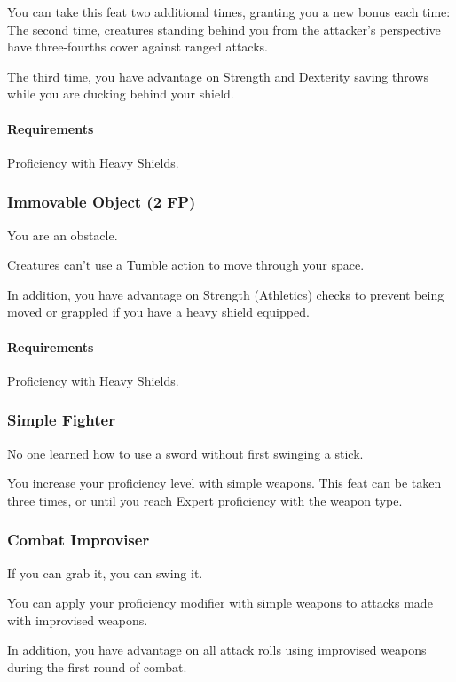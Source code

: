     You can take this feat two additional times, granting you a new bonus each time:
    The second time, creatures standing behind you from the attacker's perspective have three-fourths cover against ranged attacks.

    The third time, you have advantage on Strength and Dexterity saving throws while you are ducking behind your shield.
    \paragraph{Requirements} Proficiency with Heavy Shields.
\subsubsection{Immovable Object (2 FP)} \label{feat::immovableobject}
    You are an obstacle.

    Creatures can't use a Tumble action to move through your space.

    In addition, you have advantage on Strength (Athletics) checks to prevent being moved or grappled if you have a heavy shield equipped.
    \paragraph{Requirements} Proficiency with Heavy Shields.

\subsubsection{Simple Fighter} \label{feat::simplefighter}
    No one learned how to use a sword without first swinging a stick.

    You increase your proficiency level with simple weapons.
    This feat can be taken three times, or until you reach Expert proficiency with the weapon type.
\subsubsection{Combat Improviser} \label{feat::combatimproviser}
    If you can grab it, you can swing it.

    You can apply your proficiency modifier with simple weapons to attacks made with improvised weapons.

    In addition, you have advantage on all attack rolls using improvised weapons during the first round of combat.
